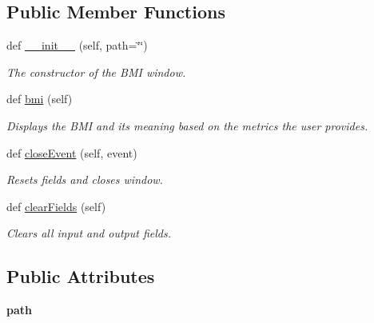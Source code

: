 \subsection*{Public Member Functions}
\begin{DoxyCompactItemize}
\item 
def \hyperlink{class_b_m_i__ui_1_1_b_m_i_window_a0a248356e06771e32f78f0e7933d066f}{\+\_\+\+\_\+init\+\_\+\+\_\+} (self, path=\char`\"{}\char`\"{})
\begin{DoxyCompactList}\small\item\em The constructor of the B\+MI window. \end{DoxyCompactList}\item 
def \hyperlink{class_b_m_i__ui_1_1_b_m_i_window_ad8708c4a841a95a31c9f9d117f4440b2}{bmi} (self)
\begin{DoxyCompactList}\small\item\em Displays the B\+MI and its meaning based on the metrics the user provides. \end{DoxyCompactList}\item 
\mbox{\label{class_b_m_i__ui_1_1_b_m_i_window_a1d47c3e49cdcab9314472251940d0790}} 
def \hyperlink{class_b_m_i__ui_1_1_b_m_i_window_a1d47c3e49cdcab9314472251940d0790}{close\+Event} (self, event)
\begin{DoxyCompactList}\small\item\em Resets fields and closes window. \end{DoxyCompactList}\item 
\mbox{\label{class_b_m_i__ui_1_1_b_m_i_window_aab2e58d48a87c09ec7cd4295c8ecd8af}} 
def \hyperlink{class_b_m_i__ui_1_1_b_m_i_window_aab2e58d48a87c09ec7cd4295c8ecd8af}{clear\+Fields} (self)
\begin{DoxyCompactList}\small\item\em Clears all input and output fields. \end{DoxyCompactList}\end{DoxyCompactItemize}
\subsection*{Public Attributes}
\begin{DoxyCompactItemize}
\item 
\mbox{\label{class_b_m_i__ui_1_1_b_m_i_window_a54aca672beae5ffa1e6e6eb51cefe459}} 
{\bfseries path}
\end{DoxyCompactItemize}


